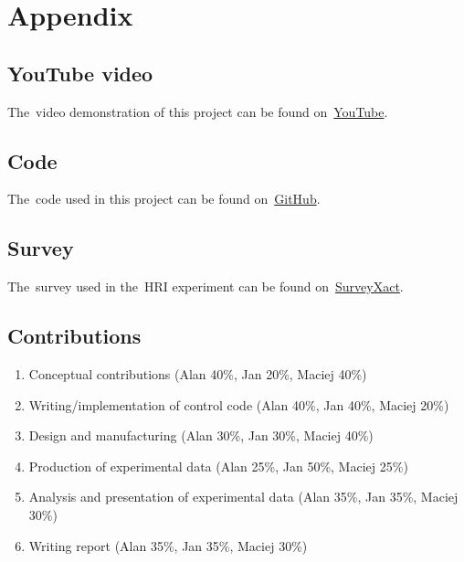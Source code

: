 \section*{Appendix}

\subsection*{YouTube video}

\par The~video demonstration of this project can be found on~\href{https://youtu.be/WA5S0skLYgE?si=YtxchnAxc7C28FYE}{YouTube}.

\subsection*{Code}

\par The~code used in this project can be found on~\href{https://github.com/AlanBejnarowicz/CycBot}{GitHub}.

\subsection*{Survey}

\par The~survey used in the~HRI experiment can be found on~\href{https://www.survey-xact.dk/LinkCollector?key=4DSJ6MZQJ112}{SurveyXact}.

\subsection*{Contributions}

\begin{enumerate}
    \item Conceptual contributions (Alan 40\%, Jan 20\%, Maciej 40\%)
    \item Writing/implementation of control code (Alan 40\%, Jan 40\%, Maciej 20\%)
    \item Design and manufacturing (Alan 30\%, Jan 30\%, Maciej 40\%)
    \item Production of experimental data (Alan 25\%, Jan 50\%, Maciej 25\%)
    \item Analysis and presentation of experimental data (Alan 35\%, Jan 35\%, Maciej 30\%)
    \item Writing report (Alan 35\%, Jan 35\%, Maciej 30\%)
\end{enumerate}
